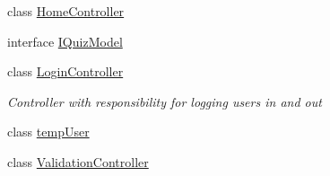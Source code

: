 \begin{DoxyCompactItemize}
class \hyperlink{class_website_1_1_controllers_1_1_home_controller}{Home\+Controller}
\item 
interface \hyperlink{interface_website_1_1_controllers_1_1_i_quiz_model}{I\+Quiz\+Model}
\item 
class \hyperlink{class_website_1_1_controllers_1_1_login_controller}{Login\+Controller}
\begin{DoxyCompactList}\small\item\em Controller with responsibility for logging users in and out \end{DoxyCompactList}\item 
class \hyperlink{class_website_1_1_controllers_1_1temp_user}{temp\+User}
\item 
class \hyperlink{class_website_1_1_controllers_1_1_validation_controller}{Validation\+Controller}
\end{DoxyCompactItemize}
